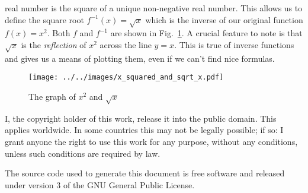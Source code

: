 \documentclass{article}
\begin{document}
    real number is the square of a unique non-negative real number. This allows
    us to define the square root $f^{-1}(x)=\sqrt{x}$ which is the inverse
    of our original function $f(x)=x^{2}$. Both $f$ and $f^{-1}$ are
    shown in Fig.~\ref{fig:x2_and_sqrt_x}. A crucial feature to note is that
    $\sqrt{x}$ is the \textit{reflection} of $x^{2}$ across the line $y=x$.
    This is true of inverse functions and gives us a means of plotting them,
    even if we can't find nice formulas.
    \begin{figure}
        \centering
        \texttt{[image: ../../images/x\_squared\_and\_sqrt\_x.pdf]}
        \caption{The graph of $x^{2}$ and $\sqrt{x}$}
        \label{fig:x2_and_sqrt_x}
    \end{figure}
    \newpage
    I, the copyright holder of this work, release it into the public domain.
    This applies worldwide. In some countries this may not be legally possible;
    if so: I grant anyone the right to use this work for any purpose, without
    any conditions, unless such conditions are required by law.
    \par\hfill\par
    The source code used to generate this document is free software and released
    under version 3 of the GNU General Public License.
\end{document}
